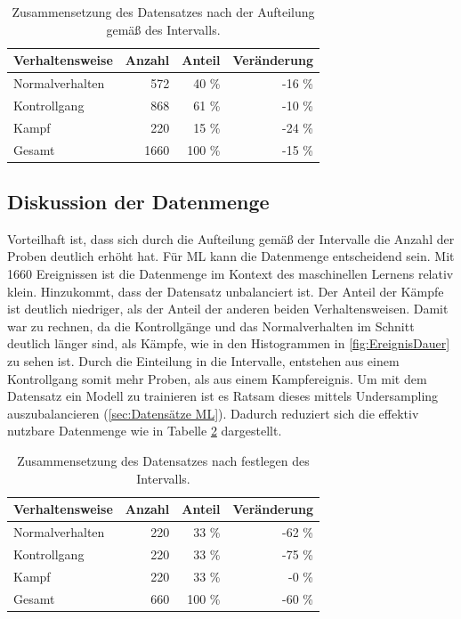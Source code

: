 \begin{table}[ht]
    \centering
    \caption{Zusammensetzung des Datensatzes nach der Aufteilung gemäß des Intervalls.}
    \begin{tabular}{|l|r|r|r|}
    \hline
        Verhaltensweise & Anzahl & Anteil & Veränderung\\
    \hline
        Normalverhalten & 572 & 40 \% & -16 \%\\
        Kontrollgang & 868 & 61 \% & -10 \%\\
        Kampf & 220 & 15 \% & -24 \%\\
    \hline
    \hline
        Gesamt & 1660 & 100 \% & -15 \% \\
    \hline
    \end{tabular}
    \label{tab:DatasetFeatExtr}
\end{table}


\subsection{Diskussion der Datenmenge}
Vorteilhaft ist, dass sich durch die Aufteilung gemäß der Intervalle die Anzahl der Proben deutlich erhöht hat. Für \gls{ML} kann die Datenmenge entscheidend sein. Mit 1660 Ereignissen ist die Datenmenge im Kontext des maschinellen Lernens relativ klein. Hinzukommt, dass der Datensatz unbalanciert ist. Der Anteil der Kämpfe ist deutlich niedriger, als der Anteil der anderen beiden Verhaltensweisen. Damit war zu rechnen, da die Kontrollgänge und das Normalverhalten im Schnitt deutlich länger sind, als Kämpfe, wie in den Histogrammen in \ref{fig:EreignisDauer} zu sehen ist. Durch die Einteilung in die Intervalle, entstehen aus einem Kontrollgang somit mehr Proben, als aus einem Kampfereignis. Um mit dem Datensatz ein Modell zu trainieren ist es Ratsam dieses mittels Undersampling auszubalancieren (\ref{sec:Datensätze ML}). Dadurch reduziert sich die effektiv nutzbare Datenmenge wie in Tabelle \ref{tab:DataNachBalance} dargestellt.

\begin{table}[ht]
    \centering
    \caption{Zusammensetzung des Datensatzes nach festlegen des Intervalls.}
    \begin{tabular}{|l|r|r|r|}
    \hline
        Verhaltensweise & Anzahl & Anteil & Veränderung\\
    \hline
        Normalverhalten & 220 & 33 \% & -62 \%\\
        Kontrollgang & 220 & 33 \% & -75 \%\\
        Kampf & 220 & 33 \% & -0 \%\\
    \hline
    \hline
        Gesamt & 660 & 100 \% & -60 \% \\
    \hline
    \end{tabular}
    \label{tab:DataNachBalance}
\end{table}

